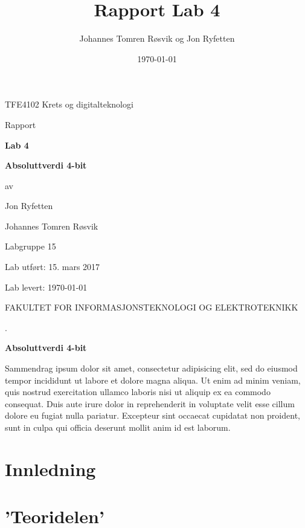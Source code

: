 \documentclass{article}
\title{Rapport Lab 4}
\author{Johannes Tomren Røsvik og Jon Ryfetten}
\date{\today}
\begin{document}

\begin{titlepage}
	\centering
	{\Large TFE4102 Krets og digitalteknologi \par}
	\vfill
	{\Large Rapport\par}
	\vspace{0.5cm}
	{\huge\bfseries Lab 4\par}
	{\huge\bfseries Absoluttverdi 4-bit\par}
	\vfill
	{av\par}
	{\Large Jon Ryfetten\par}
	{\Large Johannes Tomren Røsvik\par}
	\vspace{1cm}
	{\large Labgruppe 15 \par}
	\vfill
	{\large Lab utført: 15. mars 2017 \par}
	{\large Lab levert: \today \par}
	\vfill
	{FAKULTET FOR INFORMASJONSTEKNOLOGI OG ELEKTROTEKNIKK \par}
\end{titlepage}

\begin{titlepage}
	\centering
	{.\par}
	\vspace{7cm}
	{\huge\bfseries Absoluttverdi 4-bit \par}
	\vfill
\end{titlepage}

\newpage
Sammendrag ipsum dolor sit amet, consectetur adipisicing elit, sed do eiusmod tempor incididunt ut labore et dolore magna aliqua. Ut enim ad minim veniam, quis nostrud exercitation ullamco laboris nisi ut aliquip ex ea commodo consequat. Duis aute irure dolor in reprehenderit in voluptate velit esse cillum dolore eu fugiat nulla pariatur. Excepteur sint occaecat cupidatat non proident, sunt in culpa qui officia deserunt mollit anim id est laborum.

\newpage

\tableofcontents{}

\newpage
{}

\section{Innledning}

\newpage
\section{'Teoridelen'}
\end{document}
